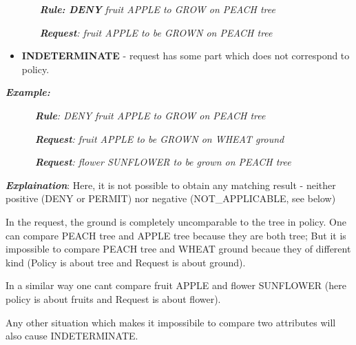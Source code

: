 \documentclass{article}
\newcommand\liststyleWWviiiNumxxi{%
\renewcommand\labelitemi{[F0B7?]}
\renewcommand\labelitemii{o}
\renewcommand\labelitemiii{[F0A7?]}
\renewcommand\labelitemiv{[F0B7?]}
}
\begin{document}
{\upshape\color{black}
\textbf{\textit{\ \ \ \ \ \ }}\textbf{\textit{Rule: DENY }}\textit{fruit
APPLE to GROW on PEACH tree}}

{\upshape\color{black}
\textbf{\textit{\ \ \ \ \ \ }}\textbf{\textit{Request}}\textit{: fruit
APPLE to be GROWN on PEACH tree}}

\liststyleWWviiiNumxxi
\begin{itemize}
\item {\color{black}
\textbf{INDETERMINATE} - request has some part which does not correspond
to policy.}
\end{itemize}
{\bfseries\itshape\color{black}
Example: }

{\upshape\color{black}
\textit{\ \ \ \ \ \ }\textbf{\textit{Rule}}\textit{: DENY fruit APPLE to
GROW on PEACH tree}}

{\upshape\color{black}
\textit{\ \ \ \ \ \ }\textbf{\textit{Request}}\textit{: fruit APPLE to
be GROWN on WHEAT ground}}

{\upshape\color{black}
\textit{\ \ \ \ \ \ }\textbf{\textit{Request}}\textit{: flower SUNFLOWER
to be grown on PEACH tree}}

{\upshape\color{black}
\textbf{\textit{Explaination}}: Here, it is not possible to obtain any
matching result - neither positive (DENY or PERMIT) nor negative
(NOT\_APPLICABLE, see below)}

{\color{black}
In the request, the {\textquotedbl}ground{\textquotedbl} is completely
uncomparable to the {\textquotedbl}tree{\textquotedbl} in policy. One
can compare {\textquotedbl}PEACH tree{\textquotedbl} and
{\textquotedbl}APPLE tree{\textquotedbl} because they are both
{\textquotedbl}tree{\textquotedbl}; But it is impossible to compare
{\textquotedbl}PEACH tree{\textquotedbl} and {\textquotedbl}WHEAT
ground{\textquotedbl} becaue they of different kind (Policy is about
tree and Request is about ground).}

{\color{black}
In a similar way one can{\textquotesingle}t compare {\textquotedbl}fruit
APPLE{\textquotedbl} and {\textquotedbl}flower SUNFLOWER{\textquotedbl}
(here policy is about fruits and Request is about flower).}

{\color{black}
Any other situation which makes it impossibile to compare two attributes
will also cause {\textquotedbl}INDETERMINATE{\textquotedbl}.}


\bigskip
\end{document}
